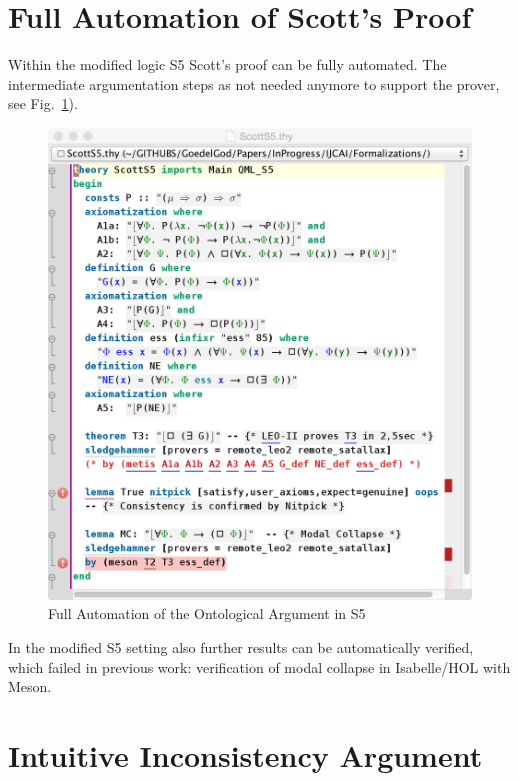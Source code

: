 \documentclass{article}
\begin{document}
\section{Full Automation of Scott's Proof}
Within the modified logic S5 Scott's proof can be fully automated. The
intermediate argumentation steps as not needed anymore to support the
prover, see Fig.~\ref{ScottS5}).
\begin{figure}
\centerline{\includegraphics[width=\columnwidth]{./Images/ScottS5.png}}
\caption{Full Automation of the Ontological Argument in S5 } \label{ScottS5}
\end{figure}




In the modified S5 setting also further results can be automatically verified, which 
failed in previous work: verification of  modal collapse in
Isabelle/HOL with Meson.

\section{Intuitive Inconsistency Argument}
\end{document}
